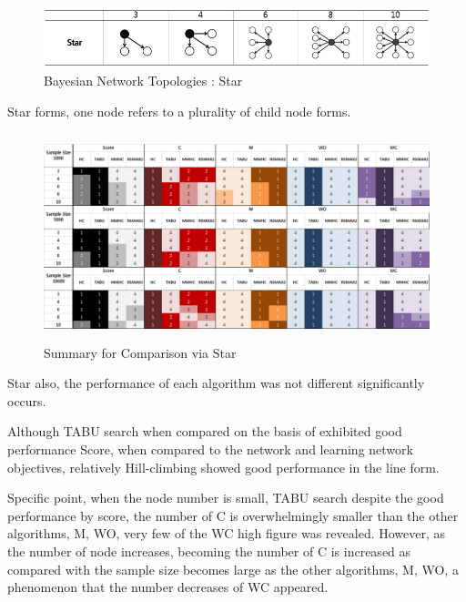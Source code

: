 	\begin{figure}[h]
	\centering
		\includegraphics[height=50pt]{Topologies_Star}
		\caption{Bayesian Network Topologies : Star}
	\end{figure}	
	
	Star forms, one node refers to a plurality of child node forms.

\begin{figure}[!bhp]
	\centering
		\includegraphics[height=170pt]{Result_Star}
		\caption{Summary for Comparison via Star}
	\end{figure}	

Star also, the performance of each algorithm was not different significantly occurs.

Although TABU search when compared on the basis of exhibited good performance Score, when compared to the network and learning network objectives, relatively Hill-climbing showed good performance in the line form.

Specific point, when the node number is small, TABU search despite the good performance by score, the number of C is overwhelmingly smaller than the other algorithms, M, WO, very few of the WC high figure was revealed. However, as the number of node increases, becoming the number of C is increased as compared with the sample size becomes large as the other algorithms, M, WO, a phenomenon that the number decreases of WC appeared.

